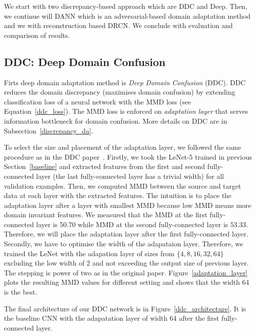 We start with two discrepancy-based approach which are DDC and Deep.
Then, we continue will DANN
which is an adversarial-based domain adaptation method
and we with reconstruction based DRCN.
We conclude with evaluation and comparison of results.

\subsection{DDC: Deep Domain Confusion}

Firts deep domain adaptation method is \textit{Deep Domain Confusion} (DDC).
DDC reduces the domain discrepancy (maximises domain confusion)
by extending classification loss of a neural network with the MMD loss
(see Equation~\ref{ddc_loss}).
The MMD loss is enforced on \textit{adaptation layer}
that serves information bottleneck for domain confusion.
More details on DDC are in Subsection~\ref{discrepancy_da}.

To select the size and placement of the adaptation layer,
we followed the same procedure as in the DDC paper~\cite{tzeng2014}.
Firstly, we took the LeNet-5 trained in previous Section~\ref{baseline}
and extracted features from the first and second fully-connected layer
(the last fully-connected layer has a trivial width)
for all validation examples.
Then, we computed MMD between the source and target data at each layer with the extracted features.
The intuition is to place the adaptation layer after a layer with smallest MMD
because low MMD means more domain invariant features.
We measured that the MMD at the first fully-connected layer is 50.70
while MMD at the second fully-connected layer is 53.33.
Therefore, we will place the adaptation layer after the first fully-connected layer.
Secondly, we have to optimise the width of the adapataion layer.
Therefore, we trained the LeNet with the adapation layer of sizes
from \(\{4, 8, 16, 32, 64\}\) excluding the low width of 2
and not exceeding the output size of previous layer.
The stepping is power of two as in the original paper.
Figure~\ref{adaptation_layer} plots the resulting MMD values for different setting
and shows that the width 64 is the best.

The final architecture of our DDC network is in Figure~\ref{ddc_architecture}.
It is the baseline CNN with the adapatation layer of width 64
after the first fully-connected layer.

